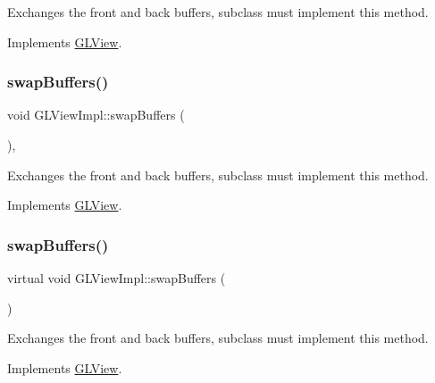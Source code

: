 Exchanges the front and back buffers, subclass must implement this method. 

Implements \hyperlink{classGLView_a8868ba73f19216f5f6c8dbcc1a7c9bb4}{G\+L\+View}.

\mbox{\label{classGLViewImpl_a29bbe397ac0cd3793fa0815b34cd37aa}} 
\subsubsection{\texorpdfstring{swap\+Buffers()}{swapBuffers()}\hspace{0.1cm}{\footnotesize\ttfamily [3/9]}}
{\footnotesize\ttfamily void G\+L\+View\+Impl\+::swap\+Buffers (\begin{DoxyParamCaption}{ }\end{DoxyParamCaption})\hspace{0.3cm}{\ttfamily [override]}, {\ttfamily [virtual]}}

Exchanges the front and back buffers, subclass must implement this method. 

Implements \hyperlink{classGLView_a8868ba73f19216f5f6c8dbcc1a7c9bb4}{G\+L\+View}.

\mbox{\label{classGLViewImpl_afe7883d151fd7d92d19d3359dc33e8b9}} 
\subsubsection{\texorpdfstring{swap\+Buffers()}{swapBuffers()}\hspace{0.1cm}{\footnotesize\ttfamily [4/9]}}
{\footnotesize\ttfamily virtual void G\+L\+View\+Impl\+::swap\+Buffers (\begin{DoxyParamCaption}{ }\end{DoxyParamCaption})\hspace{0.3cm}{\ttfamily [virtual]}}

Exchanges the front and back buffers, subclass must implement this method. 

Implements \hyperlink{classGLView_a8868ba73f19216f5f6c8dbcc1a7c9bb4}{G\+L\+View}.

\mbox{\label{classGLViewImpl_ab434675d26eb367ae74f9533c34d2ca7}} 
